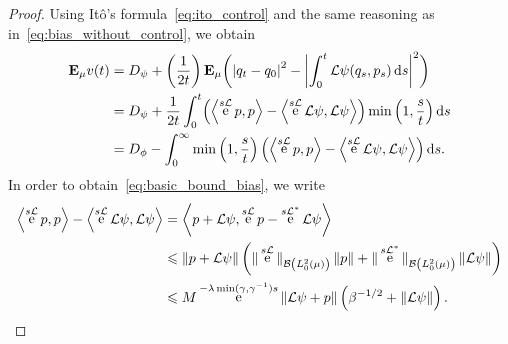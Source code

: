 \documentclass[11pt,a4paper]{article}
\DeclareMathOperator{\e}{e}
\newcommand{\expect}[0]{\mathbf{E}}
\renewcommand{\d}{\mathrm d}
\theoremstyle{plain}
\numberwithin{equation}{section}
\renewcommand{\leq}{\leqslant}
\begin{document}
\begin{proof}
Using Itô's formula~\eqref{eq:ito_control} and the same reasoning as in~\eqref{eq:bias_without_control},
we obtain
\begin{align*}
    \expect_{\mu} v(t)
    &= D_{\psi} + \left( \frac{1}{2t} \right) \expect_{\mu} \biggl( \abs{q_t - q_0}^2 - \biggl| \int_0^t {\mathcal L \psi}(q_s, p_s) \, \d s \biggr|^2 \biggr) \\
    &= D_{\psi} +  \frac{1}{2t}  \int_{0}^{t} \Bigl( \ip{\e^{s \mathcal L}p}{p} - \ip{\e^{s \mathcal L} \mathcal L \psi}{\mathcal L \psi} \Bigr) \min\left(1, \frac{s}{t}\right) \d s \\
    &= D_{\phi} - \int_{0}^{\infty} \min\left(1, \frac{s}{t}\right) \Bigl( \ip{\e^{s \mathcal L}p}{p} - \ip{\e^{s \mathcal L} \mathcal L \psi}{\mathcal L \psi} \Bigr) \, \d s.
\end{align*}
In order to obtain~\eqref{eq:basic_bound_bias}, we write
\begin{align*}
     \ip{\e^{s \mathcal L}p}{p} - \ip{\e^{s \mathcal L} \mathcal L \psi}{\mathcal L \psi}
    &= \ip{p + \mathcal L \psi}{\e^{s \mathcal L} p - \e^{s \mathcal L^*} \mathcal  L\psi} \\
    &\leq \norm{p + \mathcal L \psi}
    \left( \norm*{\e^{s \mathcal L}}[\mathcal B\left(L^2_0(\mu) \right)] \norm{p} + \norm*{\e^{s \mathcal L^*}}[\mathcal B\left(L^2_0(\mu) \right)] \norm{\mathcal L \psi} \right) \\
    &\leq M \e^{- \lambda \min(\gamma, \gamma^{-1}) s} \norm{\mathcal L\psi + p}  \left(\beta^{-1/2} + \norm{\mathcal L \psi} \right).
\end{align*}


\end{proof}
\end{document}
